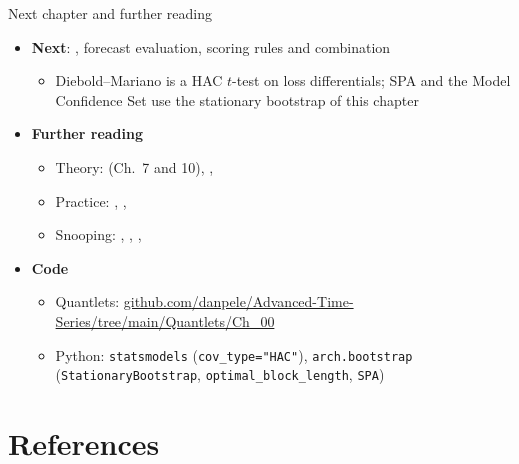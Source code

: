 \begin{frame}{Next chapter and further reading}
\itemsize{\small}
\begin{itemize}
    \item \textbf{Next}: , forecast evaluation, scoring rules and combination
    \begin{itemize}
        \item Diebold--Mariano is a HAC $t$-test on loss differentials; SPA and the Model Confidence Set use the stationary bootstrap of this chapter
    \end{itemize}
    \item \textbf{Further reading}
    \begin{itemize}
        \item Theory:  (Ch.\ 7 and 10), , 
        \item Practice: , , 
        \item Snooping: , , , 
    \end{itemize}
    \item \textbf{Code}
    \begin{itemize}
        \item Quantlets: \href{https://github.com/danpele/Advanced-Time-Series/tree/main/Quantlets/Ch_00}{github.com/danpele/Advanced-Time-Series/tree/main/Quantlets/Ch\_00}
        \item Python: \texttt{statsmodels} (\texttt{cov\_type="HAC"}), \texttt{arch.bootstrap} (\texttt{StationaryBootstrap}, \texttt{optimal\_block\_length}, \texttt{SPA})
    \end{itemize}
\end{itemize}
\end{frame}


\section{References}

